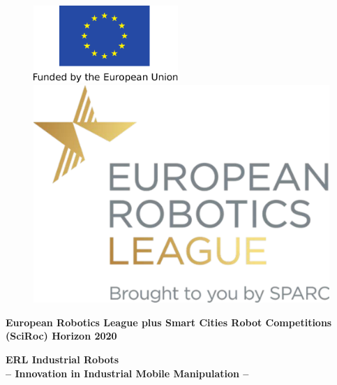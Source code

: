 
\thispagestyle{empty}

\begin{figure}
	\begin{minipage}{.4\textwidth}
		\flushright
		\vspace*{0.8cm}    
		\includegraphics[height=2.9cm]{./fig/logos/EU_flag.pdf}
	\end{minipage}%
	\begin{minipage}{.5\textwidth}
		\flushleft
		\hspace*{60pt}
		\includegraphics[scale=0.26]{./fig/logos/E-Robotics_league_logo.pdf}
	\end{minipage}
\end{figure}

\begin{center}
	\textbf{\large 
 		European Robotics League plus Smart Cities Robot Competitions (SciRoc)
 		Horizon 2020\\
	}
	
	\vspace*{10mm}
	\hrulefill
	\vspace*{5mm}

	\textbf{%
		{\Huge ERL Industrial Robots}\\[1.5ex]
		{\Large -- Innovation in Industrial Mobile Manipulation --}\\[1ex]
	}

	\hrulefill
	\vspace*{10mm}
\end{center}

